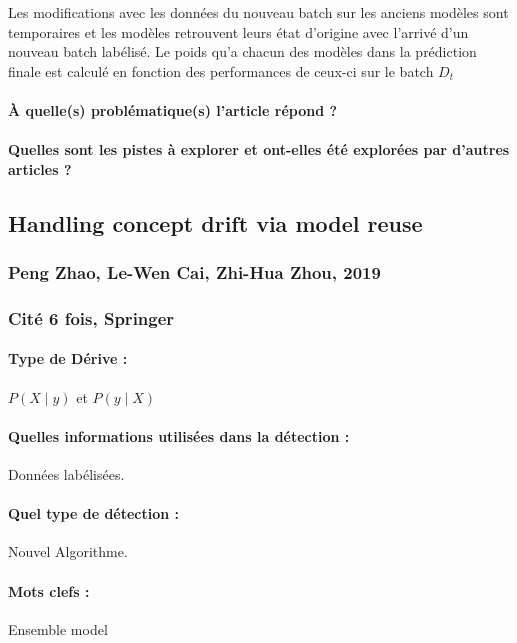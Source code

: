 \documentclass[11pt,a4paper]{report}
\begin{document}
Les  modifications avec les données du nouveau batch sur les anciens modèles sont temporaires et les modèles retrouvent leurs état d'origine avec l'arrivé d'un nouveau batch labélisé. Le poids qu'a chacun des modèles dans la prédiction finale est calculé en fonction des performances de ceux-ci sur le batch $D_t$

\paragraph{À quelle(s) problématique(s) l'article répond ?} 

\paragraph{Quelles sont les pistes à explorer et ont-elles  été explorées par d'autres articles ?} 




\subsection{Handling concept drift via model reuse}
\subsubsection{Peng Zhao, Le-Wen Cai, Zhi-Hua Zhou, 2019}

\subsubsection{Cité 6 fois, Springer}

\paragraph{Type de Dérive :} $P(X\mid y)$ et $P(y \mid X)$
\paragraph{Quelles informations utilisées dans la détection :} Données labélisées.
\paragraph{Quel type de détection :} Nouvel Algorithme.

\paragraph{Mots clefs :} Ensemble model
\end{document}
